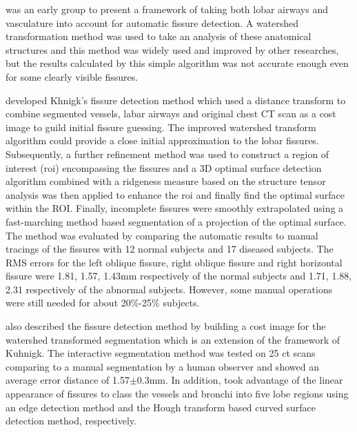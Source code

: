 \cite{kuhnigk2003lung,kuhnigk2005informatics} was an early group to present a framework of taking both lobar airways and vasculature into account for automatic fissure detection. A watershed transformation method was used to take an analysis of these anatomical structures and this method was widely used and improved by other researches, but the results calculated by this simple algorithm was not accurate enough even for some clearly visible fissures. 

\cite{ukil2009anatomy} developed Khnigk's fissure detection method which used a distance transform to combine segmented vessels, labar airways and original chest CT scan as a cost image to guild initial fissure guessing. The improved watershed transform algorithm could provide a close initial approximation to the lobar fissures. Subsequently, a further refinement method was used to construct a region of interest (\gls{roi}) encompassing the fissures and a 3D optimal surface detection algorithm combined with a ridgeness measure based on the structure tensor analysis was then applied to enhance the \gls{roi} and finally find the optimal surface within the ROI. Finally, incomplete fissures were smoothly extrapolated using a fast-marching method based segmentation of a projection of the optimal surface. The method was evaluated by comparing the automatic results to manual tracings of the fissures with 12 normal subjects and 17 diseased subjects. The RMS errors for the left oblique fissure, right oblique fissure and right horizontal fissure were 1.81, 1.57, 1.43mm respectively of the normal subjects and 1.71, 1.88, 2.31 respectively of the abnormal subjects. However, some manual operations were still needed for about 20\%-25\% subjects. 

\cite{lassen2010automatic} also described the fissure detection method by building a cost image for the watershed transformed segmentation which is an extension of the framework of Kuhnigk. The interactive segmentation method was tested on 25 \gls{ct} scans comparing to a manual segmentation by a human observer and showed an average error distance of 1.57$ \pm $0.3mm. In addition, \cite{zhou2004automatic,saita2006algorithm} took advantage of the linear appearance of fissures to class the vessels and bronchi into five lobe regions using an edge detection method and the Hough transform based curved surface detection method, respectively. 

